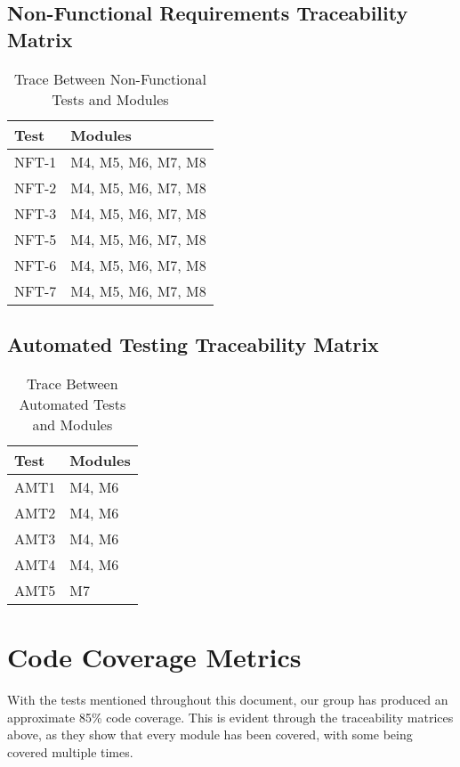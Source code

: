\documentclass[12pt, titlepage]{article}
\begin{document}
\newpage

\subsection{Non-Functional Requirements Traceability Matrix}
\begin{table}[H]
\centering
\begin{tabular}{p{} p{}}
\toprule
\textbf{Test} & \textbf{Modules}\\
\midrule
NFT-1 & M4, M5, M6, M7, M8\\
NFT-2 & M4, M5, M6, M7, M8\\
NFT-3 & M4, M5, M6, M7, M8\\
NFT-5 & M4, M5, M6, M7, M8\\
NFT-6 & M4, M5, M6, M7, M8\\
NFT-7 & M4, M5, M6, M7, M8\\
\bottomrule
\end{tabular}
\caption{Trace Between Non-Functional Tests and Modules}
\label{TblNFTM}
\end{table}

\newpage

\subsection{Automated Testing Traceability Matrix}
\begin{table}[H]
\centering
\begin{tabular}{p{} p{}}
\toprule
\textbf{Test} & \textbf{Modules}\\
\midrule
AMT1 & M4, M6\\
AMT2 & M4, M6\\
AMT3 & M4, M6\\
AMT4 & M4, M6\\
AMT5 & M7\\
\bottomrule
\end{tabular}
\caption{Trace Between Automated Tests and Modules}
\label{TblATM}
\end{table}

\newpage
	
\section{Code Coverage Metrics}					%

With the tests mentioned throughout this document, our group has produced an approximate 85\% code coverage. This is evident through the traceability matrices above, as they show that every module has been covered, with some being covered multiple times.
\end{document}
